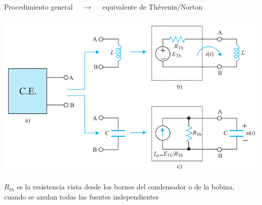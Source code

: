 \documentclass[aspectratio=169, usenames,svgnames,dvipsnames]{beamer}
\begin{document}
\begin{frame}{Procedimiento general $\quad\rightarrow\quad$ equivalente de Thévenin/Norton}
    \vspace{0.5mm}

    \hspace{13mm}
    \includegraphics[height=0.82\textheight]{../figs/Thevenin_PrimerOrden.pdf}

    \vspace{-3mm}
    $R_{th}$ es la \alert{resistencia vista desde los bornes} del condensador o de la bobina, cuando se anulan todas las fuentes independientes
\end{frame}

\end{document}
